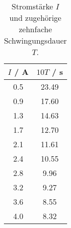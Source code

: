 \begin{table}[!htp]
\centering
\caption{Stromstärke $I$ und zugehörige zehnfache Schwingungsdauer $T$.}
\label{tab:schwing}
\begin{tabular}{c c}
\toprule
{$I$ / A} & {$10 T$ / s} \\
\midrule
0.5 & 23.49 \\
0.9 & 17.60 \\
1.3 & 14.63 \\
1.7 & 12.70 \\
2.1 & 11.61 \\
2.4 & 10.55 \\
2.8 &  9.96 \\
3.2 &  9.27 \\
3.6 &  8.55 \\
4.0 &  8.32 \\
\bottomrule
\end{tabular}
\end{table}